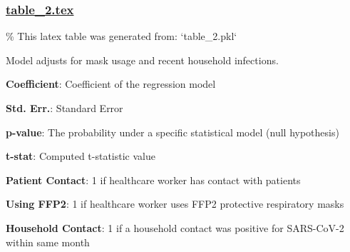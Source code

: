 \documentclass[11pt]{article}
\begin{document}
\subsubsection*{\hyperlink{code-LaTeX Table Design-table-2-tex}{table\_2.tex}}

\begin{codeoutput}
\% This latex table was generated from: `table\_2.pkl`
\begin{table}[h]
\caption{Association Between Patient Contact and Number of Symptoms}
\label{table:patient\_symptoms}
\begin{threeparttable}
\renewcommand{\TPTminimum}{\linewidth}
\begin{tablenotes}
\footnotesize
\item Model adjusts for mask usage and recent household infections.
\item \textbf{Coefficient}: Coefficient of the regression model
\item \textbf{Std. Err.}: Standard Error
\item \textbf{p-value}: The probability under a specific statistical model (null hypothesis)
\item \textbf{t-stat}: Computed t-statistic value
\item \textbf{Patient Contact}: 1 if healthcare worker has contact with patients
\item \textbf{Using FFP2}: 1 if healthcare worker uses FFP2 protective respiratory masks
\item \textbf{Household Contact}: 1 if a household contact was positive for SARS-CoV-2 within same month
\end{tablenotes}
\end{threeparttable}
\end{table}
\end{codeoutput}
\end{document}
